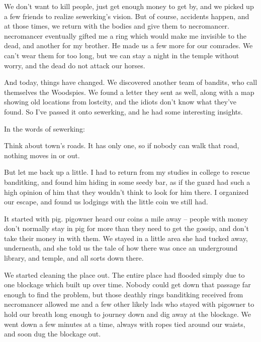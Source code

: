 \begin{multicols}{2}
\begin{exampletext}
  We don't want to kill people, just get enough money to get by, and we picked up a few friends to realize \gls{sewerking}'s vision.
  But of course, accidents happen, and at those times, we return with the bodies and give them to \gls{necromancer}.
  \Gls{necromancer} eventually gifted me a ring which would make me invisible to the dead, and another for my brother.
  He made us a few more for our comrades.
  We can't wear them for too long, but we can stay a night in the temple without worry, and the dead do not attack our horses.

  And today, things have changed.
  We discovered another team of bandits, who call themselves the Woodspies.
  We found a letter they sent as well, along with a map showing old locations from \gls{lostcity}, and the idiots don't know what they've found.
  So I've passed it onto \gls{sewerking}, and he had some interesting insights.

\end{exampletext}

In the words of \gls{sewerking}:
\label{blightConspiracy}

\begin{exampletext}

  Think about \gls{town}'s roads.
  It has only one, so if nobody can walk that road, nothing moves in or out.

  But let me back up a little.
  I had to return from my studies in \gls{college} to rescue \gls{banditking}, and found him hiding in some seedy bar, as if the \gls{guard} had such a high opinion of him that they wouldn't think to look for him there.
  I organized our escape, and found us lodgings with the little coin we still had.

  It started with \gls{pig}.
  \Gls{pigowner} heard our coins a mile away -- people with money don't normally stay in \gls{pig} for more than they need to get the gossip, and don't take their money in with them.
  We stayed in a little area she had tucked away, underneath, and she told us the tale of how there was once an underground library, and temple, and all sorts down there.

  We started cleaning the place out.
  The entire place had flooded simply due to one blockage which built up over time.
  Nobody could get down that passage far enough to find the problem, but those deathly rings \gls{banditking} received from \gls{necromancer} allowed me and a few other likely lads who stayed with \gls{pigowner} to hold our breath long enough to journey down and dig away at the blockage.
  We went down a few minutes at a time, always with ropes tied around our waists, and soon dug the blockage out.


\end{exampletext}
\end{multicols}
